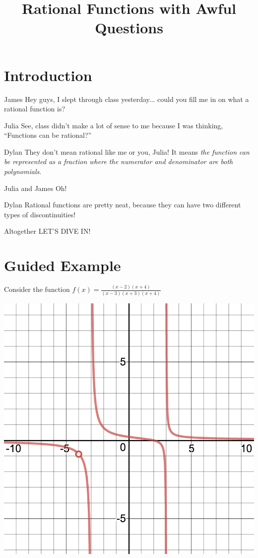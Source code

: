 \documentclass{ximera}
\title{Rational Functions with Awful Questions}
\begin{document}
\maketitle
\section{Introduction}
\begin{dialogue}
\item[James] Hey guys, I slept through class yesterday... could you fill me in on what a rational function is?
\item[Julia] See, class didn't make a lot of sense to me because I was thinking, ``Functions can be rational?''
\item[Dylan] They don't mean rational like me or you, Julia! It means \textit{the function can be represented as a fraction where the numerator and denominator are both polynomials}.
\item[Julia and James] Oh!
\item[Dylan] Rational functions are pretty neat, because they can have two different types of discontinuities!
\item[Altogether] LET'S DIVE IN!
\end{dialogue}
\section{Guided Example}
Consider the function $f(x)=\frac{(x-2)(x+4)}{(x-3)(x+3)(x+4)}$
\begin{image}
\includegraphics{discontinuityGraph}
\end{image}
\end{document}
